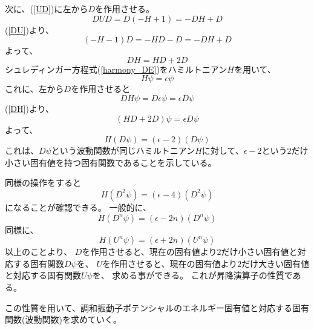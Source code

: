 次に、(\ref{UD})に左から$D$を作用させる。
\begin{equation}
	DUD = D(-H+1) = -DH + D
\end{equation}
(\ref{DU})より、
\begin{equation}
	(-H-1)D = -HD-D = -DH + D
\end{equation}
よって、
\begin{equation}
	\label{DH}
	DH = HD + 2D
\end{equation}
シュレディンガー方程式(\ref{harmony_DE})をハミルトニアン$H$を用いて、
\begin{equation}
	\label{Hpsi}
	H\psi = \epsilon\psi
\end{equation}
これに、左から$D$を作用させると
\begin{equation}
		DH\psi = D\epsilon\psi
							= \epsilon D \psi
\end{equation}
(\ref{DH})より、
\begin{equation}
	(HD + 2D)\psi = \epsilon D \psi
\end{equation}
よって、
\begin{equation}
	H(D\psi) = (\epsilon-2)(D\psi)
\end{equation}
これは、$D\psi$という波動関数が同じハミルトニアン$H$に対して、$\epsilon-2$という$2$だけ小さい固有値を持つ固有関数であることを示している。

同様の操作をすると
\begin{equation}
	H(D^2\psi) = (\epsilon-4)(D^2\psi)
\end{equation}
になることが確認できる。
一般的に、
\begin{equation}
	H(D^n\psi) = (\epsilon-2n)(D^n\psi)
\end{equation}
同様に、
\begin{equation}
	H(U^n\psi) = (\epsilon+2n)(U^n\psi)
\end{equation}
以上のことより、
$D$を作用させると、現在の固有値より$2$だけ小さい固有値と対応する固有関数$D\psi$を、
$U$を作用させると、現在の固有値より$2$だけ大きい固有値と対応する固有関数$U\psi$を、
求める事ができる。
これが昇降演算子の性質である。

この性質を用いて、調和振動子ポテンシャルのエネルギー固有値と対応する固有関数(波動関数)を求めていく。


